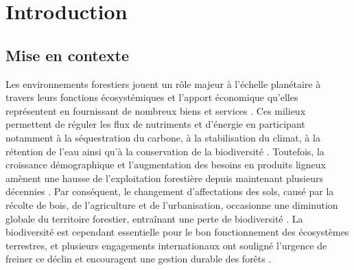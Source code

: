 \chapter*{Introduction}         %
\label{chap-introduction}       %


\section*{Mise en contexte}
\label{sec:contexte}

Les environnements forestiers jouent un rôle majeur à l’échelle planétaire à travers leurs fonctions écosystémiques et l'apport économique qu’elles représentent en fournissant de nombreux biens et services \citep{Balvanera2006Quantifyingevidence}. 
Ces milieux permettent de réguler les flux de nutriments et d’énergie en participant notamment à la séquestration du carbone, à la stabilisation du climat, à la rétention de l’eau ainsi qu’à la conservation de la biodiversité \citep{Balvanera2006Quantifyingevidence,Diaz2006BiodiversityLoss,Canadell2008Managingforests,Pawson2013Plantationforests}. 
Toutefois, la croissance démographique et l’augmentation des besoins en produits ligneux amènent une hausse de l’exploitation forestière depuis maintenant plusieurs décennies \citep{Foley2005GlobalConsequences}. 
Par conséquent, le changement d’affectations des sols, causé par la récolte de bois, de l’agriculture et de l’urbanisation, occasionne une diminution globale du territoire forestier, entraînant une perte de biodiversité \citep{Bengtsson2000Biodiversitydisturbances,Sala2000Globalbiodiversity,Naeem2012functionsbiological,Bichet2016Maintaininganimal}. 
La biodiversité est cependant essentielle pour le bon fonctionnement des écosystèmes terrestres, et plusieurs engagements internationaux ont souligné l'urgence de freiner ce déclin et encouragent une gestion durable des forêts \citep{Newbold2015Globaleffects}. 

